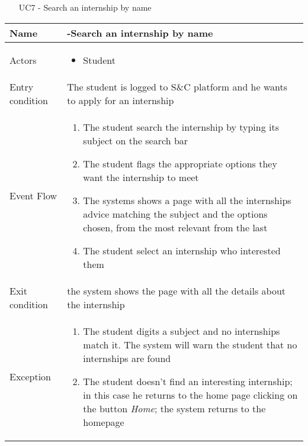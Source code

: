 				\begin{table} [H]
					\centering
					\begin{itemize}
						\item [UC7] - Search an internship by name 
					\end{itemize}
					\begin{tabular}{|| P{7.5cm} | P{7.5cm} ||}
						\hline
						Name & -Search an internship by name \\
						\hline
						Actors & \parbox{5cm}{\begin{itemize}
								\item Student
							\end{itemize}
						} \\
						\hline
						Entry condition & The student is logged to S\&C platform and he wants to apply for an internship \\
						\hline
						Event Flow & \parbox{5cm}{\begin{enumerate}[label=\alpha]
								\item The student search the internship 
								by typing its subject on the search 
								bar 
								\item The student flags the appropriate 
								options they want the internship to 
								meet  
								\item The systems shows a page with all 
								the internships advice matching 
								the subject and the options chosen, from the most relevant from the last
								\item The student select an internship who 
								interested them
						\end{enumerate}} \\
						\hline 
						Exit condition &  the system shows the 
						page with all the details about the 
						internship \\
						\hline
						Exception & \parbox{5cm}{\begin{enumerate}[label=\alpha]
								\item The student digits a subject and no 
								internships match it. The system 
								will warn the student that no 
								internships are found 
								\item The student doesn’t find an 
								interesting internship; in this case 
								he returns to the home page 
								clicking on the button \textit{Home}; the 
								system returns to the homepage
								\end{enumerate}} \\
						\hline
					\end{tabular}
				\end{table}
				
